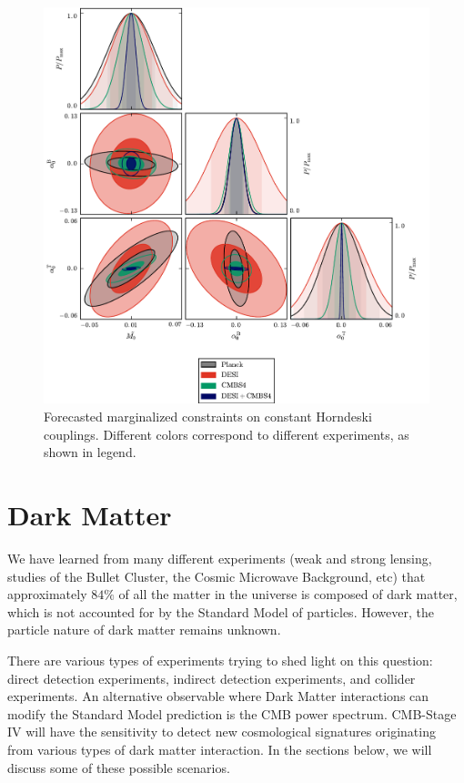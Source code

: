 \begin{figure}[!tb]
\begin{center}
\includegraphics[width=1.0\textwidth]{DarkEnergy/7_Const_alpha}
\caption{Forecasted marginalized constraints on constant Horndeski couplings. Different colors correspond to different experiments, as shown in legend.}\label{fig:ConstantAlpha}
\end{center}
\end{figure}

\clearpage

\section{Dark Matter}


We have learned from many different experiments (weak and strong lensing, studies of the Bullet Cluster, the Cosmic Microwave Background, etc) that approximately $84\%$ of all the matter in the universe is composed of dark matter, which is not accounted for by the Standard Model of particles. However, the particle nature of dark matter remains unknown.

There are various types of experiments trying to shed light on this question: direct detection experiments, indirect detection experiments, and collider experiments. 
An alternative observable where Dark Matter interactions can modify the Standard Model prediction is the CMB power spectrum.
CMB-Stage IV will have the sensitivity to detect new cosmological signatures originating from various types of dark matter interaction. In the sections below, we will discuss some of these possible scenarios.

